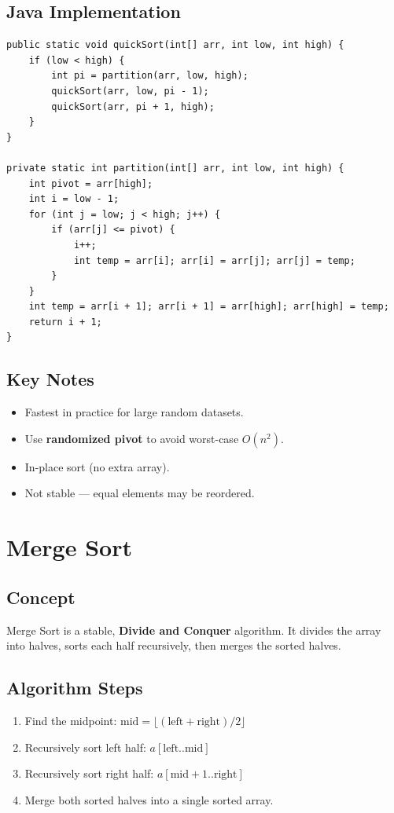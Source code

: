 \documentclass[12pt,a4paper]{article}
\begin{document}
\subsection{Java Implementation}
\begin{lstlisting}[style=javastyle, caption={Quick Sort — Java}]
public static void quickSort(int[] arr, int low, int high) {
    if (low < high) {
        int pi = partition(arr, low, high);
        quickSort(arr, low, pi - 1);
        quickSort(arr, pi + 1, high);
    }
}

private static int partition(int[] arr, int low, int high) {
    int pivot = arr[high];
    int i = low - 1;
    for (int j = low; j < high; j++) {
        if (arr[j] <= pivot) {
            i++;
            int temp = arr[i]; arr[i] = arr[j]; arr[j] = temp;
        }
    }
    int temp = arr[i + 1]; arr[i + 1] = arr[high]; arr[high] = temp;
    return i + 1;
}
\end{lstlisting}

\subsection{Key Notes}
\begin{itemize}
    \item Fastest in practice for large random datasets.
    \item Use \textbf{randomized pivot} to avoid worst-case $O(n^2)$.
    \item In-place sort (no extra array).
    \item Not stable — equal elements may be reordered.
\end{itemize}

\newpage

\section{Merge Sort}

\subsection{Concept}
Merge Sort is a stable, \textbf{Divide and Conquer} algorithm. It divides the array into halves, sorts each half recursively, then merges the sorted halves.

\subsection{Algorithm Steps}
\begin{enumerate}
    \item Find the midpoint: $\text{mid} = \lfloor (\text{left} + \text{right}) / 2 \rfloor$
    \item Recursively sort left half: $a[\text{left}..\text{mid}]$
    \item Recursively sort right half: $a[\text{mid}+1..\text{right}]$
    \item Merge both sorted halves into a single sorted array.
\end{enumerate}
\end{document}
